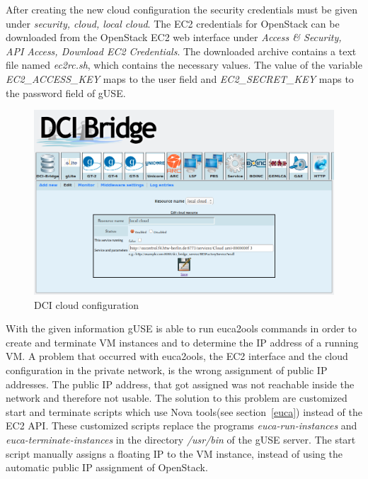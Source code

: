 After creating the new cloud configuration the security credentials must be given under \textit{security, cloud, local cloud}.
The EC2 credentials for OpenStack can be downloaded from the OpenStack EC2 web interface under \textit{Access \& Security, API Access, Download EC2 Credentials}.
The downloaded archive contains a text file named \textit{ec2rc.sh}, which contains the necessary values.
The value of the variable \textit{EC2\_ACCESS\_KEY} maps to the user field and \textit{EC2\_SECRET\_KEY} maps to the password field of gUSE.

\begin{figure}%
                \centering
                \includegraphics[width=2.0\columnwidth]{images/dci-cloud-settings.png}
                \caption{DCI cloud configuration}
                \label{fig:cloudconfig}
\end{figure}

With the given information gUSE is able to run euca2ools commands in order to create and terminate VM instances and to determine the IP address of a running VM.
A problem that occurred with euca2ools, the EC2 interface and the cloud configuration in the private network, is the wrong assignment of public IP addresses.
The public IP address, that got assigned was not reachable inside the network and therefore not usable.
The solution to this problem are customized start and terminate scripts \cite{customscripts} which use Nova tools(see section~\ref{euca}) instead of the EC2 API.
These customized scripts replace the programs \textit{euca-run-instances} and \textit{euca-terminate-instances} in the directory \textit{/usr/bin} of the gUSE server.
The start script manually assigns a floating IP to the VM instance, instead of using the automatic public IP assignment of OpenStack.

